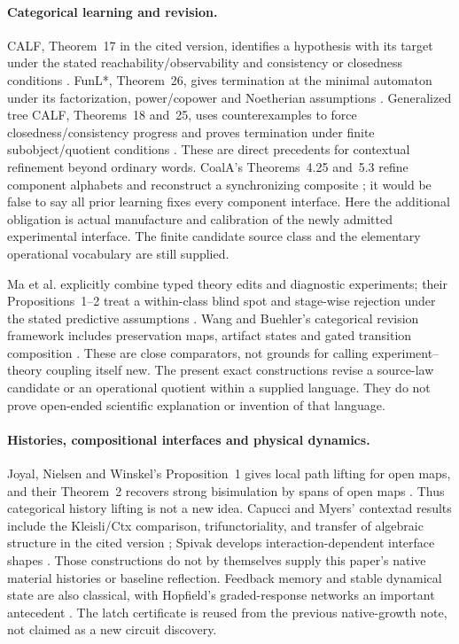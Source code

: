 \documentclass[11pt]{article}
\theoremstyle{definition}
\theoremstyle{remark}
\begin{document}
\paragraph{Categorical learning and revision.}
CALF, Theorem~17 in the cited version, identifies a hypothesis with its
target under the stated reachability/observability and consistency or
closedness conditions \cite{CALF2017}. FunL*, Theorem~26, gives termination
at the minimal automaton under its factorization, power/copower and
Noetherian assumptions \cite{FunL2021}. Generalized tree CALF,
Theorems~18 and~25, uses counterexamples to force closedness/consistency
progress and proves termination under finite subobject/quotient
conditions \cite{TreeCALF2022}. These are direct precedents for
contextual refinement beyond ordinary words. CoalA's Theorems~4.25 and~5.3
refine component alphabets and reconstruct a synchronizing composite
\cite{CoalA2025}; it would be false to say all prior learning fixes every
component interface. Here the additional obligation is actual manufacture
and calibration of the newly admitted experimental interface. The finite
candidate source class and the elementary operational vocabulary are
still supplied.

Ma et al. explicitly combine typed theory edits and diagnostic experiments;
their Propositions~1--2 treat a within-class blind spot and stage-wise
rejection under the stated predictive assumptions \cite{Ma2026}.
Wang and Buehler's categorical revision framework includes preservation
maps, artifact states and gated transition composition
\cite{WB2026}. These are close comparators, not grounds for calling
experiment--theory coupling itself new. The present exact constructions
revise a source-law candidate or an operational quotient within a
supplied language. They do not prove open-ended scientific explanation or
invention of that language.

\paragraph{Histories, compositional interfaces and physical dynamics.}
Joyal, Nielsen and Winskel's Proposition~1 gives local path lifting for
open maps, and their Theorem~2 recovers strong bisimulation by spans of
open maps \cite{JNW1996}. Thus categorical history lifting is not a new
idea. Capucci and Myers' contextad results include the Kleisli/Ctx
comparison, trifunctoriality, and transfer of algebraic structure in the
cited version \cite{CM2026}; Spivak develops interaction-dependent
interface shapes \cite{Spivak2026}. Those constructions do not by
themselves supply this paper's native material histories or baseline
reflection. Feedback memory and stable dynamical state are also classical,
with Hopfield's graded-response networks an important antecedent
\cite{Hopfield1984}. The latch certificate is reused from the previous
native-growth note, not claimed as a new circuit discovery.
\end{document}
